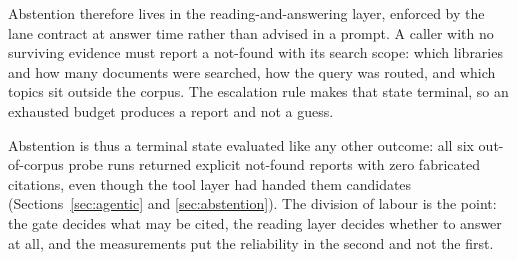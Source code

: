 Abstention therefore lives in the reading-and-answering layer, enforced by the
lane contract at answer time rather than advised in a prompt. A caller with no
surviving evidence must report a not-found with its search scope: which libraries
and how many documents were searched, how the query was routed, and which topics
sit outside the corpus. The escalation rule makes that state terminal, so an
exhausted budget produces a report and not a guess.

Abstention is thus a terminal state evaluated like any other outcome: all six
out-of-corpus probe runs returned explicit not-found reports with zero fabricated
citations, even though the tool layer had handed them candidates
(Sections~\ref{sec:agentic} and \ref{sec:abstention}). The division of labour is
the point: the gate decides what may be cited, the reading layer decides whether
to answer at all, and the measurements put the reliability in the second and not
the first.
